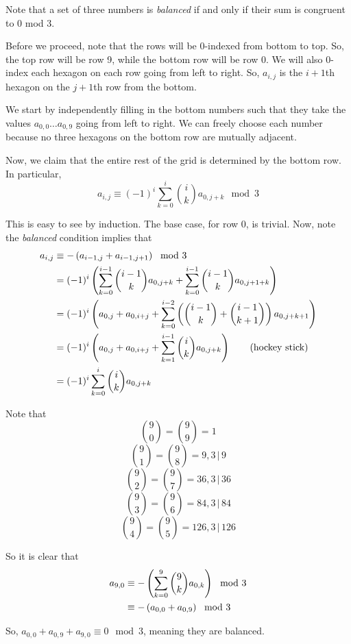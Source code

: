 \documentclass[10pt]{../usamts}
\begin{document}
\begin{solution}
Note that a set of three numbers is \textit{balanced} if and only if their sum is congruent to 0 mod 3.

Before we proceed, note that the rows will be 0-indexed from bottom to top. So, the top row will be row 9, while the bottom row will be row 0. We will also 0-index each hexagon on each row going from left to right. So, $a_{i,j}$ is the $i+1$th hexagon on the $j+1$th row from the bottom.

We start by independently filling in the bottom numbers such that they take the values $a_{0,0} \dots a_{0,9}$ going from left to right. We can freely choose each number because no three hexagons on the bottom row are mutually adjacent.

Now, we claim that the entire rest of the grid is determined by the bottom row. In particular, $$a_{i,j} \equiv (-1)^{i} \sum_{k=0}^{i} \binom{i}{k} a_{0,j+k} \mod 3$$

This is easy to see by induction. The base case, for row 0, is trivial. Now, note the \textit{balanced} condition implies that
\begin{align*}
    a_{i,j} &\equiv -\left( a_{i-1,j}+a_{i-1,j+1} \right) \mod 3\\
            &= (-1)^{i} \left( \sum_{k=0}^{i-1} \binom{i-1}{k} a_{0,j+k} + \sum_{k=0}^{i-1} \binom{i-1}{k} a_{0,j+1+k} \right)\\
            &= (-1)^{i}\left( a_{0,j} + a_{0,i+j} + \sum_{k=0}^{i-2} \left( \binom{i-1}{k} + \binom{i-1}{k+1} \right) a_{0,j+k+1}  \right)\\
            &= (-1)^{i}\left( a_{0,j} + a_{0,i+j} + \sum_{k=1}^{i-1} \binom{i}{k} a_{0,j+k}  \right) \tag{hockey stick}\\
            &= (-1)^{i} \sum_{k=0}^{i} \binom{i}{k} a_{0,j+k}\\
\end{align*}

Note that
$$\binom{9}{0} = \binom{9}{9} = 1$$
$$\binom{9}{1} = \binom{9}{8} = 9, 3\,|\,9$$
$$\binom{9}{2} = \binom{9}{7} = 36, 3\,|\,36$$
$$\binom{9}{3} = \binom{9}{6} = 84, 3\,|\,84$$
$$\binom{9}{4} = \binom{9}{5} = 126, 3\,|\,126$$

So it is clear that
\begin{align*}
    a_{9,0} &\equiv -\left( \sum_{k=0}^{9} \binom{9}{k} a_{0,k} \right) \mod 3\\
    &\equiv -\left( a_{0,0} + a_{0,9} \right) \mod 3\\
\end{align*}

So, $a_{0,0} + a_{0,9} + a_{9,0} \equiv 0 \mod 3$, meaning they are balanced.

\end{solution}
\end{document}

